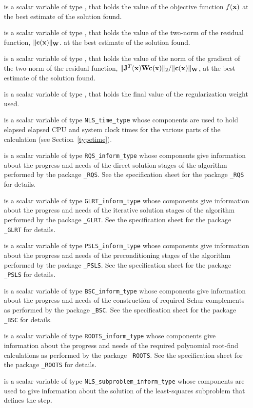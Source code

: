 \documentclass{galahad}
\newcommand{\packagename}{NLS}
\begin{document}
\begin{description}
 is a scalar variable of type \realdp, that holds the
value of the objective function $f({\mathbf{x}})$  at the best estimate
of the solution found.

 is a scalar variable of type \realdp, that holds the
value of the two-norm of the residual function, $\|{\mathbf{c}}({\mathbf{x}})\|_{{\mathbf{W}}}$.
at the best estimate of the solution found.

 is a scalar variable of type \realdp, that holds the
value of the norm of the gradient of the two-norm of the residual function,
$\|{\mathbf{J}}^T({\mathbf{x}}) {\mathbf{W}} {\mathbf{c}}({\mathbf{x}})\|_2/\|{\mathbf{c}}({\mathbf{x}})\|_{{\mathbf{W}}}$, at the best estimate
of the solution found.

 is a scalar variable of type \realdp, that holds the
final value of the regularization weight used.

 is a scalar variable of type {\tt \packagename\_time\_type}
whose components are used to hold elapsed elapsed CPU and system clock
times for the various parts of the calculation (see Section~\ref{typetime}).

 is a scalar variable of type
{\tt RQS\_inform\_type}
whose components give information about the progress and needs
of the direct solution stages of the algorithm performed by the package
{\tt \libraryname\_RQS}.
See the specification sheet for the package
{\tt \libraryname\_RQS}
for details.

 is a scalar variable of type
{\tt GLRT\_inform\_type}
whose components give information about the progress and needs
of the iterative solution stages of the algorithm performed by the package
{\tt \libraryname\_GLRT}.
See the specification sheet for the package
{\tt \libraryname\_GLRT}
for details.

 is a scalar variable of type
{\tt PSLS\_inform\_type}
whose components give information about the progress and needs
of the preconditioning stages of the algorithm performed by the package
{\tt \libraryname\_PSLS}.
See the specification sheet for the package
{\tt \libraryname\_PSLS} for details.

 is a scalar variable of type
{\tt BSC\_inform\_type}
whose components give information about the progress and needs
of the construction of required Schur complements
as performed by the package
{\tt \libraryname\_BSC}.
See the specification sheet for the package
{\tt \libraryname\_BSC} for details.

 is a scalar variable of type
{\tt ROOTS\_inform\_type}
whose components give information about the progress and needs
of the required polynomial root-find calculations
as performed by the package
{\tt \libraryname\_ROOTS}.
See the specification sheet for the package
{\tt \libraryname\_ROOTS} for details.

  is a scalar variable of type
{\tt \packagename\_subproblem\_inform\_type}
whose components are used to give information about the solution of the
least-squares subproblem that defines the step.
\end{description}
\end{document}
